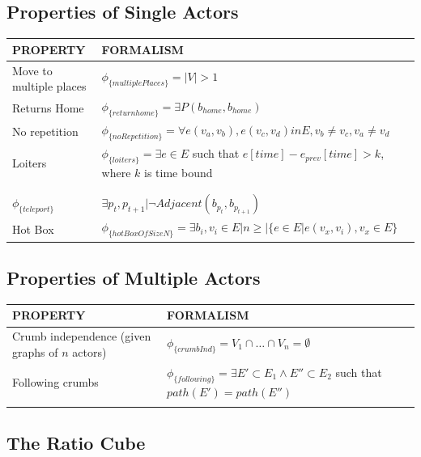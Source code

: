 \subsection{Properties of Single Actors}


\begin{tabular}{| p{2.8cm} | p{11.5cm} | }
\hline
PROPERTY & FORMALISM \\ \hline
Move to multiple places & $\phi_{\{multiplePlaces\}} = |V| > 1$ \\ \hline
Returns Home & $\phi_{\{returnhome\}} = \exists P(b_{home}, b_{home})$ \\ \hline
No repetition & $\phi_{\{noRepetition\}} = \forall e(v_a, v_b), e(v_c,v_d) in E, v_b \neq v_c, v_a \neq v_d$ \\ \hline
 Loiters & $\phi_{\{loiters\}} =  \exists e \in E$ such that $e[time] - e_{prev}[time] > k$, where $k$ is time bound \\ \hline
 & \\ \hline
 & \\ \hline
$\phi_{\{teleport\}}$ & $  \exists  p_t, p_{t+1} | \lnot Adjacent(b_{p_t}, b_{p_{t+1}})$ \\ \hline
Hot Box & $\phi_{\{hotBoxOfSizeN\}} = \exists b_i, v_i \in E | n \geq |\{e \in E | e(v_x, v_i), v_x \in E\}$ \\ \hline
\end{tabular}


\subsection{Properties of Multiple Actors}
\begin{tabular}{| p{2.8cm} | p{11.5cm} | }
\hline
PROPERTY & FORMALISM \\ \hline
 Crumb independence (given graphs of $n$ actors)& $\phi_{\{crumbInd\}} =  V_1 \cap \ldots \cap V_n = \emptyset $ \\ \hline
 Following crumbs & $\phi_{\{following\}} =  \exists E' \subset E_1 \land E'' \subset E_2$ such that $path(E')=path(E'') $  \\ \hline
 & \\ \hline
\end{tabular}

\subsection{The Ratio Cube}

